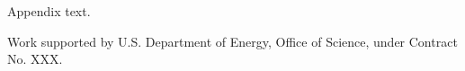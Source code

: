 \documentclass[pdf]{iucr}              %
\begin{document}
Appendix text.



Work supported by U.S. Department of Energy, Office of Science, under Contract No. XXX.




 
\end{document}
